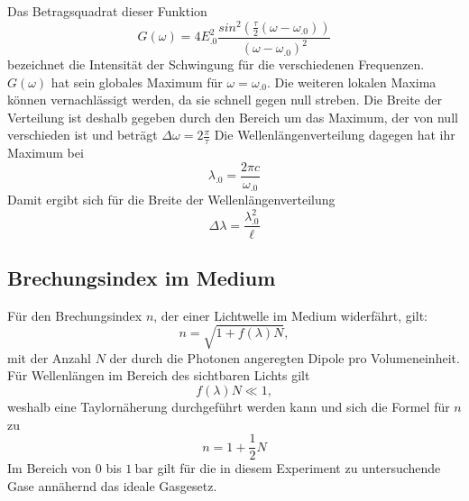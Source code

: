 Das Betragsquadrat dieser Funktion
\begin{equation*}
G(\omega)=4E^2_.0\frac{sin^2(\frac{\tau}{2}(\omega-\omega_.0))}{(\omega-\omega_.0)^2}
\end{equation*}
bezeichnet die Intensität der Schwingung für die verschiedenen Frequenzen.
$G(\omega)$ hat sein globales Maximum für $\omega =\omega_.0$. Die weiteren lokalen Maxima können vernachlässigt werden, da sie schnell gegen null streben.
Die Breite der Verteilung ist deshalb gegeben durch den Bereich um das Maximum, der von null verschieden ist und beträgt
$\Delta\omega=2\frac{\pi}{\tau}$
Die Wellenlängenverteilung dagegen hat ihr Maximum bei 
\[
\lambda_.0=\frac{2\pi c}{\omega_.0}
\]
Damit ergibt sich für die Breite der Wellenlängenverteilung
\begin{equation}
\Delta\lambda=\frac{\lambda^2_.0}{\ell}\label{eq:dl}
\end{equation}
\subsection{Brechungsindex im Medium}
Für den Brechungsindex $n$, der einer Lichtwelle im Medium widerfährt, gilt:
\begin{equation*}
n= \sqrt{1+f(\lambda)N},
\end{equation*}
mit der Anzahl $N$ der durch die Photonen angeregten Dipole pro Volumeneinheit.\newline
Für Wellenlängen im Bereich des sichtbaren Lichts gilt
\[
f(\lambda)N\ll 1,
\]
weshalb eine Taylornäherung durchgeführt werden kann und sich die Formel für $n$ zu 
\begin{equation}
n= 1+\frac{1}{2}N\label{eq:n}
\end{equation}
Im Bereich von $0$ bis $\SI{1}{\bar}$ gilt für die in diesem Experiment zu untersuchende Gase annähernd das ideale Gasgesetz.
